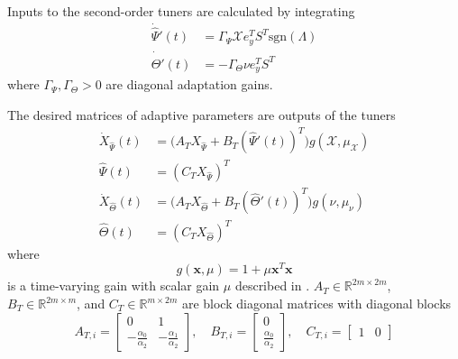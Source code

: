 Inputs to the second-order tuners are calculated by integrating
\begin{equation}
\begin{aligned}
\dot{\hat{\Psi}}'(t) &= \Gamma_{\Psi} \mathcal{X} e_y^T S^T \text{sgn}(\Lambda) \\
\dot{\hat{\Theta}}'(t) &= -\Gamma_{\Theta} \nu e_y^T S^T
\end{aligned}
\end{equation}
where $\Gamma_{\Psi}, \Gamma_{\Theta} > 0$ are diagonal adaptation gains. 

The desired matrices of adaptive parameters are outputs of the tuners
\begin{equation}
\begin{aligned}
	\dot{X}_{\hat{\Psi}}(t) &= \big( A_T X_{\hat{\Psi}} + B_T (\hat{\Psi}'(t))^T \big) g(\mathcal{X}, \mu_{\mathcal{X}}) \\
	\hat{\Psi}(t) &= (C_T X_{\hat{\Psi}})^T \\
	\dot{X}_{\hat{\Theta}}(t) &= \big( A_T X_{\hat{\Theta}} + B_T (\hat{\Theta}'(t))^T \big) g(\nu, \mu_{\nu}) \\
	\hat{\Theta}(t) &= (C_T X_{\hat{\Theta}})^T
\end{aligned}	
\end{equation}
where
\begin{equation}
g(\mathbf{x}, \mu) = 1 + \mu \mathbf{x}^T \mathbf{x}	
\end{equation}
is a time-varying gain with scalar gain $\mu$ described in \cite{qu2016phd}. $A_T \in \mathbb{R}^{2m \times 2m}$, $B_T \in \mathbb{R}^{2m \times m}$, and $C_T \in \mathbb{R}^{m \times 2m}$ are block diagonal matrices with diagonal blocks
\begin{equation}
A_{T,i} = \begin{bmatrix}
	0 & 1\\ -\frac{\alpha_0}{\alpha_2} & -\frac{\alpha_1}{\alpha_2}
\end{bmatrix}, \quad B_{T,i} = \begin{bmatrix}
	0 \\ \frac{\alpha_0}{\alpha_2}
\end{bmatrix}, \quad C_{T,i} = \begin{bmatrix}
	1 & 0
\end{bmatrix}
\end{equation}


